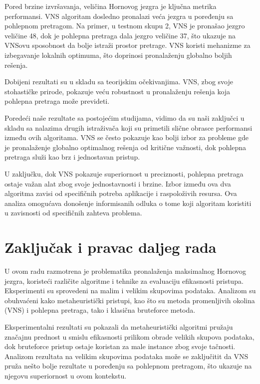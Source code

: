 \documentclass[12pt,oneside]{memoir}
\begin{document}
Pored brzine izvršavanja, veličina Hornovog jezgra je ključna metrika performansi. VNS algoritam dosledno pronalazi veća jezgra u poređenju sa pohlepnom pretragom. Na primer, u testnom skupu 2, VNS je pronašao jezgro veličine 48, dok je pohlepna pretraga dala jezgro veličine 37, što ukazuje na VNSovu sposobnost da bolje istraži prostor pretrage. VNS koristi mehanizme za izbegavanje lokalnih optimuma, što doprinosi pronalaženju globalno boljih rešenja.

Dobijeni rezultati su u skladu sa teorijskim očekivanjima. VNS, zbog svoje stohastičke prirode, pokazuje veću robustnost u pronalaženju rešenja koja pohlepna pretraga može prevideti.

Poredeći naše rezultate sa postojećim studijama, vidimo da su naši zaključci u skladu sa nalazima drugih istraživača koji su primetili slične obrasce performansi između ovih algoritama. VNS se često pokazuje kao bolji izbor za probleme gde je pronalaženje globalno optimalnog rešenja od kritične važnosti, dok pohlepna pretraga služi kao brz i jednostavan pristup.

U zaključku, dok VNS pokazuje superiornost u preciznosti, pohlepna pretraga ostaje važan alat zbog svoje jednostavnosti i brzine. Izbor između ova dva algoritma zavisi od specifičnih potreba aplikacije i raspoloživih resursa. Ova analiza omogućava donošenje informisanih odluka o tome koji algoritam koristiti u zavisnosti od specifičnih zahteva problema.





\chapter{Zaključak i pravac daljeg rada}

U ovom radu razmotrena je problematika pronalaženja maksimalnog Hornovog jezgra, koristeći različite algoritme i tehnike za evaluaciju efikasnosti pristupa. Eksperimenti su sprovedeni na malim i velikim skupovima podataka. Analizom su obuhvaćeni kako metaheuristički pristupi, kao što su metoda promenljivih okolina (VNS) i pohlepna pretraga, tako i klasična bruteforce metoda. 

Eksperimentalni rezultati su pokazali da metaheuristički algoritmi pružaju značajnu prednost u smislu efikasnosti prilikom obrade velikih skupova podataka, dok bruteforce pristup ostaje koristan za male instance zbog svoje tačnosti.
Analizom rezultata na velikim skupovima podataka može se zaključitit da VNS pruža nešto bolje rezultate u poređenju sa pohlepnom pretragom, što ukazuje na njegovu superiornost u ovom kontekstu.
\end{document}
